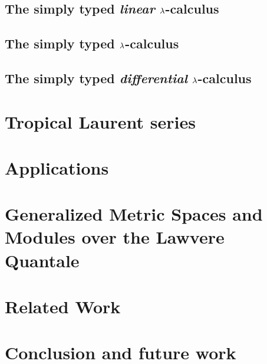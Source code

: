 \documentclass[conference]{IEEEtran}
\begin{document}
\subsection{The simply typed \emph{linear} $\lambda$-calculus}


\subsection{The simply typed $\lambda$-calculus}
%

\subsection{The simply typed \emph{differential} $\lambda$-calculus}
%


\section{Tropical Laurent series}
%


\section{Applications}\label{sec:app}
%


\section{Generalized Metric Spaces and Modules over the Lawvere Quantale}\label{sec:QMod}
%


\section{Related Work}



\section{Conclusion and future work}\label{sec:concl}

\end{document}
